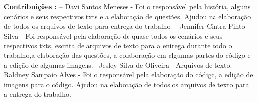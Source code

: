 \documentclass{article}
\begin{document}
\Huge{\bf Contribuições :}
\newline
\newline
\normalsize{-- Davi Santos Meneses - Foi o responsável pela história, alguns cenários e seus respectivos txts e a elaboração de questões. Ajudou na elaboração de todos os arquivos de texto para entrega do trabalho.
\newline
\newline
-- Jennifer Cintra Pinto Silva - Foi responsável pela elaboração de quase todos os cenários e seus respectivos txts, escrita de arquivos de texto para a entrega durante todo o trabalho,a elaboração das questões, a colaboração em algumas partes do código e a edição de algumas imagens.
\newline
\newline
--Jesley Silva de Oliveira - Arquivos de texto.
\newline
\newline
-- Raldney Sampaio Alves - Foi o responsável pela elaboração do código, a edição de imagens para o código. Ajudou na elaboração de todos os arquivos de texto para a entrega do trabalho.
}
\end{document}

